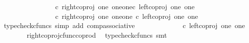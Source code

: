 \begin{isabellebody}
\ \ \isamarkupfalse%
{\isacharminus}{\kern0pt}\ \isanewline
\ \ \ \ \isamarkupfalse%
\ {\isachardoublequoteopen}{\isasymlangle}{\isasymt}{\isacharcomma}{\kern0pt}{\isasymt}{\isasymrangle}\ {\isasymamalg}\ {\isasymlangle}{\isasymf}{\isacharcomma}{\kern0pt}\ {\isasymf}{\isasymrangle}\ {\isasymamalg}\ {\isasymlangle}{\isasymf}{\isacharcomma}{\kern0pt}{\isasymt}{\isasymrangle}\ {\isasymcirc}\isactrlsub c\ {\isacharparenleft}{\kern0pt}right{\isacharunderscore}{\kern0pt}coproj\ one\ {\isacharparenleft}{\kern0pt}one{\isasymCoprod}one{\isacharparenright}{\kern0pt}{\isasymcirc}\isactrlsub c\ left{\isacharunderscore}{\kern0pt}coproj\ one\ one{\isacharparenright}{\kern0pt}\ {\isacharequal}{\kern0pt}\ \isanewline
\ \ \ \ \ \ \ \ \ \ {\isacharparenleft}{\kern0pt}{\isasymlangle}{\isasymt}{\isacharcomma}{\kern0pt}{\isasymt}{\isasymrangle}\ {\isasymamalg}\ {\isasymlangle}{\isasymf}{\isacharcomma}{\kern0pt}\ {\isasymf}{\isasymrangle}\ {\isasymamalg}\ {\isasymlangle}{\isasymf}{\isacharcomma}{\kern0pt}{\isasymt}{\isasymrangle}\ {\isasymcirc}\isactrlsub c\ right{\isacharunderscore}{\kern0pt}coproj\ one\ {\isacharparenleft}{\kern0pt}one{\isasymCoprod}one{\isacharparenright}{\kern0pt}\ {\isacharparenright}{\kern0pt}{\isasymcirc}\isactrlsub c\ left{\isacharunderscore}{\kern0pt}coproj\ one\ one{\isachardoublequoteclose}\isanewline
\ \ \ \ \ \ \isamarkupfalse%
\ {\isacharparenleft}{\kern0pt}typecheck{\isacharunderscore}{\kern0pt}cfuncs{\isacharcomma}{\kern0pt}\ simp\ add{\isacharcolon}{\kern0pt}\ comp{\isacharunderscore}{\kern0pt}associative{}{\isacharparenright}{\kern0pt}\isanewline
\ \ \ \ \isamarkupfalse%
\ \isamarkupfalse%
\ {\isachardoublequoteopen}{\isachardot}{\kern0pt}{\isachardot}{\kern0pt}{\isachardot}{\kern0pt}\ {\isacharequal}{\kern0pt}\ {\isasymlangle}{\isasymf}{\isacharcomma}{\kern0pt}\ {\isasymf}{\isasymrangle}\ {\isasymamalg}\ {\isasymlangle}{\isasymf}{\isacharcomma}{\kern0pt}{\isasymt}{\isasymrangle}\ {\isasymcirc}\isactrlsub c\ left{\isacharunderscore}{\kern0pt}coproj\ one\ one{\isachardoublequoteclose}\isanewline
\ \ \ \ \ \ \isamarkupfalse%
\ right{\isacharunderscore}{\kern0pt}coproj{\isacharunderscore}{\kern0pt}cfunc{\isacharunderscore}{\kern0pt}coprod\ \isamarkupfalse%
\ {\isacharparenleft}{\kern0pt}typecheck{\isacharunderscore}{\kern0pt}cfuncs{\isacharcomma}{\kern0pt}\ smt{\isacharparenright}{\kern0pt}\isanewline
\ \ \ \ \isamarkupfalse%
\ \isamarkupfalse%
\ {\isachardoublequoteopen}{\isachardot}{\kern0pt}{\isachardot}{\kern0pt}{\isachardot}{\kern0pt}\ {\isacharequal}{\kern0pt}\ {\isasymlangle}{\isasymf}{\isacharcomma}{\kern0pt}\ {\isasymf}{\isasymrangle}{\isachardoublequoteclose}\isanewline

\end{isabellebody}
